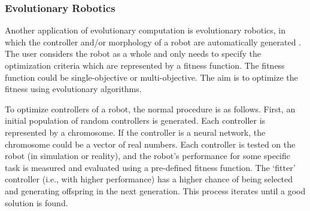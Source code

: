 \subsubsection{Evolutionary Robotics}\label{sec:evolutionary_robotics}

Another application of evolutionary computation is evolutionary robotics, in which the controller and/or morphology of a robot are automatically generated \cite{Doncieux2015, Eiben:2015:ER}. The user considers the robot as a whole and only needs to specify the optimization criteria which are represented by a fitness function. The fitness function could be single-objective or multi-objective. The aim is to optimize the fitness using evolutionary algorithms. 

To optimize controllers of a robot, the normal procedure is as follows. First, an initial population of random controllers is generated. Each controller is represented by a chromosome. If the controller is a neural network, the chromosome could be a vector of real numbers. Each controller is tested on the robot (in simulation or reality), and the robot's performance for some specific task is measured and evaluated using a pre-defined fitness function. The `fitter' controller (i.e., with higher performance) has a higher chance of being selected and generating offspring in the next generation. This process iterates until a good solution is found. 


